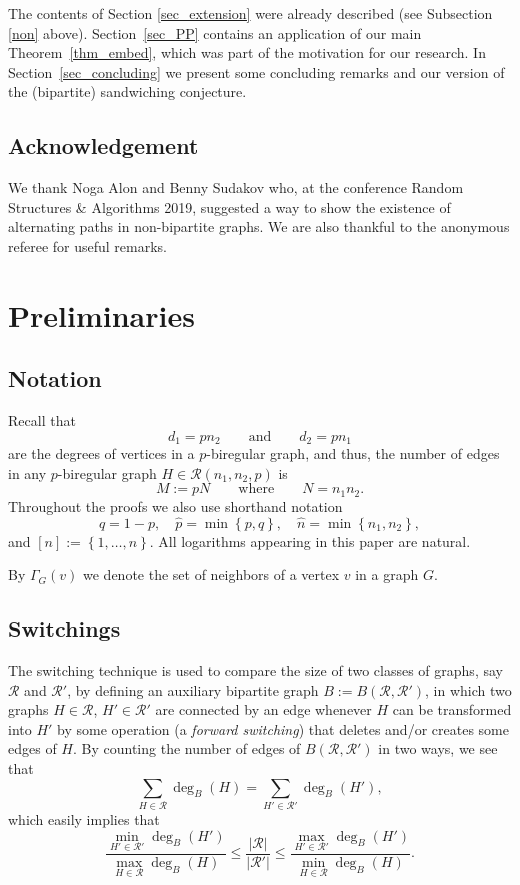 \documentclass[12pt,reqno]{amsart}
\newcommand{\rc}{{\mathcal{R}}}
\newcommand{\rcnnp}{\rc(n_1,n_2,p)}
\theoremstyle{definition}
\begin{document}
	The contents of Section \ref{sec_extension} were already described (see Subsection \ref{non} above).  Section~\ref{sec_PP} contains an application of our main Theorem~\ref{thm_embed}, which was part of the motivation for our research.
In Section~\ref{sec_concluding} we present some concluding remarks and our version of the (bipartite) sandwiching conjecture.

\subsection{Acknowledgement}
 We thank Noga Alon and Benny Sudakov who, at the conference Random Structures \& Algorithms 2019, suggested a way to show the existence of alternating paths in non-bipartite graphs. We are also thankful to the anonymous referee for useful remarks.

\section{Preliminaries}
\label{sec_tools}

\subsection{Notation}
Recall that
\[
	d_1 = pn_2\qquad\text{and}\qquad d_2 = pn_1
\]
are the degrees of vertices in a $p$-biregular graph, and thus, the number of edges in any $p$-biregular graph $H \in \rcnnp$ is
\[
	M:=pN\qquad\text{where}\qquad N=n_1n_2.
\]
Throughout the proofs we also use shorthand notation
\begin{equation}
  \label{eq_not}
	q = 1 - p, \quad \hat p = \min \left\{ p, q \right\}, \quad \hat n = \min \left\{ n_1,n_2 \right\},
\end{equation}
and $[n] := \left\{ 1, \dots, n \right\}$. All logarithms appearing in this paper are natural.

By $\Gamma_{G}(v)$ we denote the set of neighbors of a vertex $v$ in a graph $G$.


\subsection{Switchings}
\label{ss_switchings}
The switching technique is used to compare the size of two classes of graphs, say $\rc$ and $\rc'$, by defining an auxiliary bipartite graph $B:=B(\rc,\rc')$, in which two graphs $H \in \rc$, $H' \in \rc'$ are connected by an edge whenever $H$ can be transformed into $H'$ by some operation (a \emph{forward switching}) that deletes and/or creates some edges of $H$.
By counting the number of edges of $B(\rc,\rc')$ in two ways, we see that
\begin{equation}
  \label{eq_BRR}
	\sum_{H\in\rc}\deg_B(H) = \sum_{H'\in\rc'}\deg_B(H'),
\end{equation}
which easily implies that
\begin{equation}
  \label{eq_countingedges}
\frac{\min_{H' \in \rc'} \deg_B(H')}{\max_{H \in \rc} \deg_B(H)} \le \frac{|\rc|}{|\rc'|} \le \frac{\max_{H' \in \rc'} \deg_B(H')}{\min_{H \in \rc} \deg_B(H)}.
\end{equation}
\end{document}
